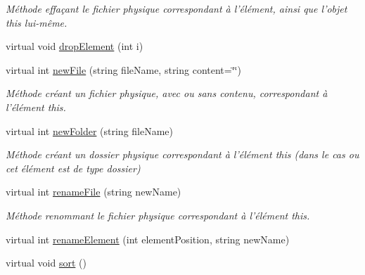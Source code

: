 \begin{DoxyCompactItemize}
\begin{DoxyCompactList}\small\item\em Méthode effaçant le fichier physique correspondant à l'élément, ainsi que l'objet this lui-\/même. \item\end{DoxyCompactList}\item 
virtual void \hyperlink{class_element_ad43315969bc33b67d181c4cd170b0ad5}{dropElement} (int i)
\item 
virtual int \hyperlink{class_element_a8c395a5e83fd3700b837c2a3370fbfa1}{newFile} (string fileName, string content=\char`\"{}\char`\"{})
\begin{DoxyCompactList}\small\item\em Méthode créant un fichier physique, avec ou sans contenu, correspondant à l'élément this. \item\end{DoxyCompactList}\item 
virtual int \hyperlink{class_element_ac55b55d91825094b3493c61af32f225a}{newFolder} (string fileName)
\begin{DoxyCompactList}\small\item\em Méthode créant un dossier physique correspondant à l'élément this (dans le cas ou cet élément est de type dossier) \item\end{DoxyCompactList}\item 
virtual int \hyperlink{class_element_aa7bdd2e0ea4620e4e0c32831765bea38}{renameFile} (string newName)
\begin{DoxyCompactList}\small\item\em Méthode renommant le fichier physique correspondant à l'élément this. \item\end{DoxyCompactList}\item 
virtual int \hyperlink{class_element_a3662859ed7a939aa07b31b92b3e7e817}{renameElement} (int elementPosition, string newName)
\item 
\hypertarget{class_element_a0f7bd30a3cc6ccc7bf322f53f70c519e}{
virtual void \hyperlink{class_element_a0f7bd30a3cc6ccc7bf322f53f70c519e}{sort} ()}
\label{class_element_a0f7bd30a3cc6ccc7bf322f53f70c519e}


\end{DoxyCompactItemize}

